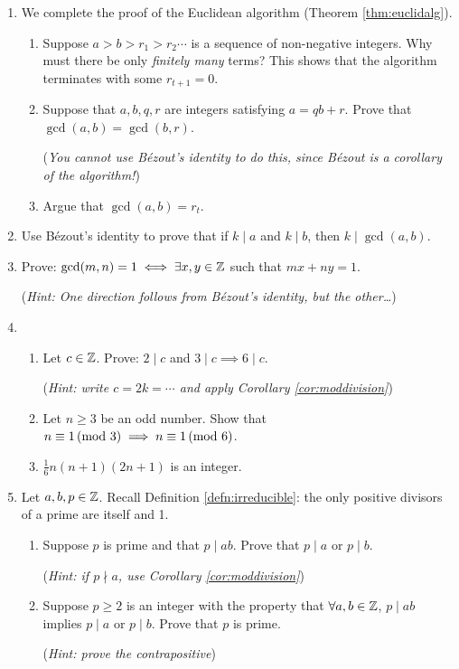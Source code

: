 \begin{exercises}{}{}
\begin{enumerate}
  \item\label{exs:euclidalgproof} We complete the proof of the Euclidean algorithm (Theorem \ref{thm:euclidalg}).
  \begin{enumerate}
    \item Suppose $a>b>r_1>r_2\cdots$ is a sequence of non-negative integers. Why must there be only \emph{finitely many} terms? This shows that the algorithm terminates with some $r_{t+1}=0$.
    \item Suppose that $a,b,q,r$ are integers satisfying $a=qb+r$. Prove that $\gcd(a,b)=\gcd(b,r)$.\par
    (\emph{You cannot use Bézout's identity to do this, since Bézout is a corollary of the algorithm!})
    \item Argue that $\gcd(a,b)=r_t$.
  \end{enumerate}
  
  
  \item Use Bézout's identity to prove that if $k\mid a$ and $k\mid b$, then $k\mid\gcd(a,b)$.
  

  \item\label{ex:gcd1} Prove: $\gcd(m,n)=1\iff\exists x,y\in\mathbb{Z}$ such that $mx+ny=1$.\par
  (\emph{Hint: One direction follows from Bézout's identity, but the other\ldots})
    
    
	\item\begin{enumerate}
	  \item Let $c\in\mathbb{Z}$. Prove: $2\mid c$ and $3\mid c\implies 6\mid c$.\par
	  (\emph{Hint: write $c=2k=\cdots$ and apply Corollary \ref{cor:moddivision}})
	  \item Let $n\ge 3$ be an odd number. Show that $n\equiv 1\negthickspace\pmod{3}\implies  n\equiv 1\negthickspace\pmod{6}$.
	 	\item $\frac 16n(n+1)(2n+1)$ is an integer.
	\end{enumerate}
  
  
	\item Let $a,b,p\in\mathbb{Z}$. Recall Definition \ref{defn:irreducible}: the only positive divisors of a prime are itself and 1.
  \begin{enumerate}
    \item Suppose $p$ is prime and that $p\mid ab$. Prove that $p\mid a$ or $p\mid b$.\par
    (\emph{Hint: if $p\nmid a$, use Corollary \ref{cor:moddivision}})
    \item Suppose $p\ge 2$ is an integer with the property that $\forall a,b\in\mathbb{Z}$, $p\mid ab$ implies $p\mid a$ or $p\mid b$. Prove that $p$ is prime.\par
    (\emph{Hint: prove the contrapositive})
  \end{enumerate}
    

\end{enumerate}
\end{exercises}
